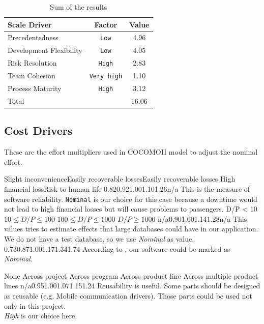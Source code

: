 \begin{table}[h!]
    \centering
\begin{tabular}{ p{5cm} | c | c }
    Scale Driver            & Factor             &  Value   \\ \hline
    Precedentedness         & \texttt{Low}       &  4.96    \\
    Development Flexibility & \texttt{Low}       &  4.05    \\
    Risk Resolution         & \texttt{High}      &  2.83    \\
    Team Cohesion           & \texttt{Very high} &  1.10    \\
    Process Maturity        & \texttt{High}      &  3.12    \\ \hline
    Total                   &                    & 16.06  
\end{tabular}
    \caption{Sum of the results}
    \label{tab:cocomo1}
\end{table}

\pagebreak
\subsection{Cost Drivers} %
These are the effort multipliers used in COCOMO\rr II model to adjust the
nominal effort. 
\label{sub:cost_drivers}

{Slight inconvenience}{Easily recoverable losses}{Easily recoverable losses}
{High financial loss}{Risk to human life}{}
{0.82}{0.92}{1.00}{1.10}{1.26}{n/a} {
    This is the measure of software reliability. \texttt{Nominal} is our choice
    for this case because a downtime would not lead to high financial losses
    but will cause problems to passengers.
}
{ }{D/P < 10}{$ 10 \leq D/P \le 100 $}{ $ 100 \leq D/P \le 1000 $} { $ D/P \ge 1000 $ } { }
{n/a}{0.90}{1.00}{1.14}{1.28}{n/a}
{This values tries to estimate effects that large databases could have in our application.
    We do not have a test database, so we use \emph{Nominal} as value.
}
{ 0.73}{0.87}{1.00}{1.17}{1.34}{1.74} { 
    According to \cite[Table~20]{bib:cocomo2}, our software could be marked as \emph{Nominal}.
}

{ } { None } { Across project } { Across program } { Across product line} 
{Across multiple product lines} { n/a}{0.95}{1.00}{1.07}{1.15}{1.24} {
    Reusability is useful. Some parts should be designed as reusable (e.g.
    Mobile communication drivers). Those parts could be used not only in this project. \\
    \emph{High} is our choice here.
}


